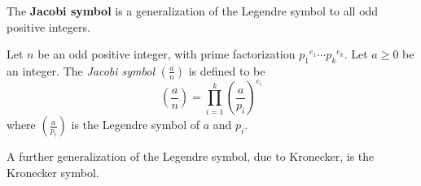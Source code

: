 \documentclass[12pt]{article}
\begin{document}
The {\bf Jacobi symbol} is a generalization of the Legendre symbol to all odd positive integers.

Let $n$ be an odd positive integer, with prime factorization ${p_1}^{e_1} \cdots {p_k}^{e_k}$.  Let $a \geq 0$ be an integer.  The {\em Jacobi symbol}  $\left(\frac{a}{n}\right)$ is defined to be
\[ \left(\frac{a}{n}\right) = \prod_{i=1}^k \left(\frac{a}{p_i}\right)^{e_i} \]
where $\left(\frac{a}{p_i}\right)$ is the Legendre symbol of $a$ and $p_i$.

A further generalization of the Legendre symbol, due to Kronecker, is the Kronecker symbol.
\end{document}
